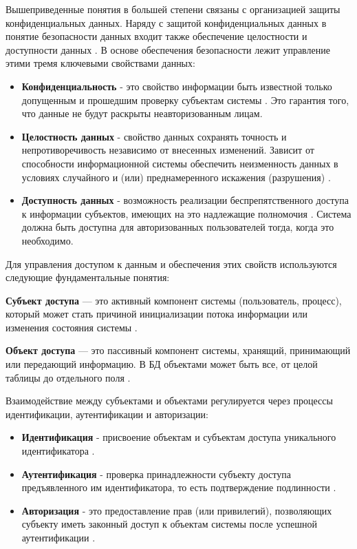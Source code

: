 Вышеприведенные понятия в большей степени связаны с организацией защиты конфиденциальных данных. Наряду с защитой конфиденциальных данных в понятие безопасности данных входит также обеспечение целостности и доступности данных \autocite[сс. 15-18]{Skakun}. В основе обеспечения безопасности лежит управление этими тремя ключевыми свойствами данных:
\begin{itemize}
    \item \textbf{Конфиденциальность} - это свойство информации быть известной только допущенным и прошедшим проверку субъектам системы \autocite[сс. 15-18]{Skakun}. Это гарантия того, что данные не будут раскрыты неавторизованным лицам.
    \item \textbf{Целостность данных} - свойство данных сохранять точность и непротиворечивость независимо от внесенных изменений. Зависит от способности информационной системы обеспечить неизменность данных в условиях случайного и (или) преднамеренного искажения (разрушения) \autocite[сс. 15-18]{Skakun}.
    \item \textbf{Доступность данных} - возможность реализации беспрепятственного доступа к информации субъектов, имеющих на это надлежащие полномочия \autocite[сс. 15-18]{Skakun}. Система должна быть доступна для авторизованных пользователей тогда, когда это необходимо.
\end{itemize}

Для управления доступом к данным и обеспечения этих свойств используются следующие фундаментальные понятия:

\textbf{Субъект доступа} — это активный компонент системы (пользователь, процесс), который может стать причиной инициализации потока информации или изменения состояния системы \autocite[сс. 15-18]{Skakun}. 

\textbf{Объект доступа} — это пассивный компонент системы, хранящий, принимающий или передающий информацию. В БД объектами может быть все, от целой таблицы до отдельного поля \autocite[сс. 15-18]{Skakun}.

Взаимодействие между субъектами и объектами регулируется через процессы идентификации, аутентификации и авторизации:
\begin{itemize}
    \item \textbf{Идентификация} - присвоение объектам и субъектам доступа уникального идентификатора \autocite[сс. 15-18]{Skakun}.
    \item \textbf{Аутентификация}  - проверка принадлежности субъекту доступа предъявленного им идентификатора, то есть подтверждение подлинности \autocite[сс. 15-18]{Skakun}.
    \item \textbf{Авторизация} - это предоставление прав (или привилегий), позволяющих субъекту иметь законный доступ к объектам системы после успешной аутентификации \autocite[сс. 15-18]{Skakun}.
\end{itemize}

